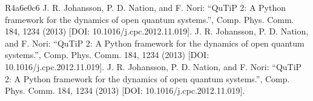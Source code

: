 \documentclass[letterpaper,10pt,english]{sphinxmanual}
\begin{document}
\begin{sphinxthebibliography}{R4a6e0c6}
J. R. Johansson, P. D. Nation, and F. Nori: “QuTiP 2: A Python framework
for the dynamics of open quantum systems.”, Comp. Phys. Comm. 184, 1234
(2013) {[}DOI: 10.1016/j.cpc.2012.11.019{]}.
J. R. Johansson, P. D. Nation, and F. Nori: “QuTiP 2: A Python framework
for the dynamics of open quantum systems.”, Comp. Phys. Comm. 184, 1234
(2013) {[}DOI: 10.1016/j.cpc.2012.11.019{]}.
J. R. Johansson, P. D. Nation, and F. Nori: “QuTiP 2: A Python framework
for the dynamics of open quantum systems.”, Comp. Phys. Comm. 184, 1234
(2013) {[}DOI: 10.1016/j.cpc.2012.11.019{]}.
\end{sphinxthebibliography}


\renewcommand{\indexname}{Python Module Index}
\begin{sphinxtheindex}
\let\bigletter\sphinxstyleindexlettergroup
\bigletter{q}
\item\relax{}
\item\relax{}
\item\relax{}
\item\relax{}
\item\relax{}
\item\relax{}
\item\relax{}
\item\relax{}
\item\relax{}
\item\relax{}
\item\relax{}

\end{sphinxtheindex}
\end{document}
